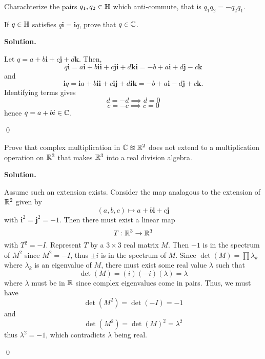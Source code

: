 \documentclass[12pt]{book}
\theoremstyle{definition}
\newenvironment{solution}
{%
  \par\noindent\textbf{Solution.}\quad
}
{%
  \qed\par
}
\begin{document}
\begin{taggedexercise}[\textcolor{red}{TODO}]
  Charachterize the pairs $q_1, q_2 \in \mathbb{H}$ which anti-commute, that is $q_1q_2 = -q_2q_1$.
\end{taggedexercise}

\begin{taggedexercise}[\textcolor{green}{Complete}]
  If $q \in \mathbb{H}$ satisfies $q\mathbf{i} = \mathbf{i}q$, prove that $q \in \mathbb{C}$.
\end{taggedexercise}
\begin{solution}
  Let $q = a + b\mathbf{i} + c\mathbf{j} + d\mathbf{k}$. Then,
  \[
    q\mathbf{i} = a\mathbf{i} + b\mathbf{i}\mathbf{i} + c\mathbf{j}\mathbf{i} + d\mathbf{k}\mathbf{i} = -b + a\mathbf{i} + d\mathbf{j} - c\mathbf{k}
  \]
  and
  \[
    \mathbf{i}q = \mathbf{i}a + b\mathbf{i}\mathbf{i} + c\mathbf{i}\mathbf{j} + d\mathbf{i}\mathbf{k} = -b + a\mathbf{i} - d\mathbf{j} + c\mathbf{k}.
  \]
  Identifying terms gives
  \[
  d = -d \implies d = 0 
  \]
  \[
  c = -c \implies c = 0
  \]
  hence $q = a+bi \in \mathbb{C}$.

\end{solution}

\begin{taggedexercise}[\textcolor{green}{Complete}]
  Prove that complex multiplication in $\mathbb{C} \approxeq \mathbb{R}^2$ does not extend to a multiplication operation on $\mathbb{R}^3$ that makes $\mathbb{R}^3$ into a real division algebra.
\end{taggedexercise}

\begin{solution}
  Assume such an extension exists. 
  Consider the map analagous to the extension of $\mathbb{R}^2$ given by
  \[
  (a,b,c) \mapsto a + b\mathbf{i} + c \mathbf{j}
  \]
  with $\mathbf{i}^2 = \mathbf{j}^2 = -1$. 
  Then there must exist a linear map 
  \[
  T: \mathbb{R}^3 \to \mathbb{R}^3
  \]
  with $T^2 = -I$. 
  Represent $T$ by a $3 \times 3$ real matrix $M$. 
  Then $-1$ is in the spectrum of $M^2$ since $M^2 = -I$, thus $\pm i$ is in the spectrum of $M$.
  Since $\det(M) = \prod \lambda_k$ where $\lambda_k$ is an eigenvalue of $M$, there must exist some real value $\lambda$ such that
  \[
  \det(M) = (i)(-i)(\lambda) = \lambda
  \]
  where $\lambda$ must be in $\mathbb{R}$ since complex eigenvalues come in pairs.
  Thus, we must have
  \[
  \det(M^2) = \det(-I) = -1
  \]
  and
  \[
  \det(M^2) = \det(M)^2 = \lambda^2
  \]
  thus $\lambda^2 = -1$, which contradicts $\lambda$ being real.
  
\end{solution}
\end{document}
